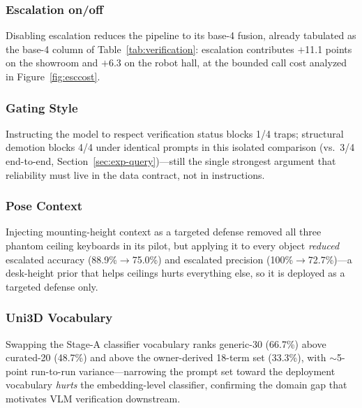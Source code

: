 \documentclass[electronics,article,accept,pdftex,moreauthors]{Definitions/mdpi}
\begin{document}
\subsubsection{Escalation on/off}
Disabling escalation reduces the pipeline to its base-4 fusion, already
tabulated as the base-4 column of Table~\ref{tab:verification}: escalation
contributes $+$11.1 points on the showroom and $+$6.3 on the robot hall,
at the bounded call cost analyzed in Figure~\ref{fig:esccost}.

\subsubsection{Gating Style}
Instructing the model to respect verification status blocks 1/4 traps;
structural demotion blocks 4/4 under identical prompts in this isolated
comparison (vs.\ 3/4 end-to-end, Section~\ref{sec:exp-query})---still the
single strongest argument that
reliability must live in the data contract, not in instructions.

\subsubsection{Pose Context}
Injecting mounting-height context as a
targeted defense removed all three phantom ceiling keyboards in its pilot,
but applying it to every object \emph{reduced} escalated accuracy
(88.9\%$\rightarrow$75.0\%) and escalated precision
(100\%$\rightarrow$72.7\%)---a desk-height prior that helps ceilings hurts
everything else, so it is deployed as a targeted defense only.

\subsubsection{Uni3D Vocabulary}
Swapping the Stage-A classifier vocabulary ranks generic-30 (66.7\%) above
curated-20 (48.7\%) and above the owner-derived 18-term set (33.3\%), with
$\sim$5-point run-to-run variance---narrowing the prompt set toward the
deployment vocabulary \emph{hurts} the embedding-level classifier,
confirming the domain gap that motivates VLM verification downstream.
\end{document}
